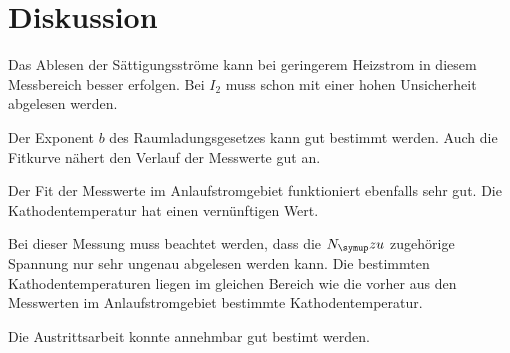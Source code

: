 \section{Diskussion}
\label{sec:Diskussion}

Das Ablesen der Sättigungsströme kann bei geringerem Heizstrom
in diesem Messbereich besser erfolgen. Bei $I_2$
muss schon mit einer hohen Unsicherheit abgelesen werden.

Der Exponent $b$ des Raumladungsgesetzes kann gut bestimmt werden.
Auch die Fitkurve nähert den Verlauf der Messwerte gut an.

Der Fit der Messwerte im Anlaufstromgebiet funktioniert ebenfalls
sehr gut. Die Kathodentemperatur hat einen vernünftigen Wert.

Bei dieser Messung muss beachtet werden, dass die $N_\g{zu}$ zugehörige
Spannung nur sehr ungenau abgelesen werden kann. Die bestimmten
Kathodentemperaturen liegen im gleichen Bereich wie die vorher aus den
Messwerten im Anlaufstromgebiet bestimmte Kathodentemperatur.

Die Austrittsarbeit konnte annehmbar gut bestimt werden. 
